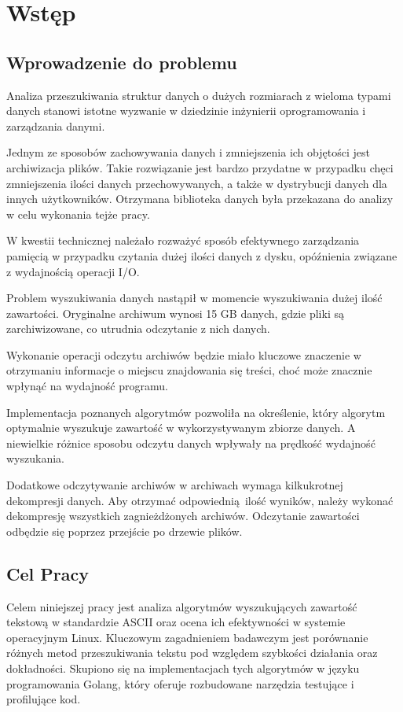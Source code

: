 \chapter{Wstęp}

\section{Wprowadzenie do problemu}
Analiza przeszukiwania struktur danych o dużych rozmiarach z wieloma typami danych stanowi
istotne wyzwanie w dziedzinie inżynierii oprogramowania i zarządzania danymi. 

Jednym ze sposobów zachowywania danych i zmniejszenia ich objętości jest 
archiwizacja plików. Takie rozwiązanie jest bardzo przydatne w przypadku chęci
zmniejszenia ilości danych przechowywanych, a także w dystrybucji danych dla
innych użytkowników. Otrzymana biblioteka danych była przekazana do analizy w 
celu wykonania tejże pracy.

W kwestii technicznej należało rozważyć sposób efektywnego zarządzania pamięcią
w przypadku czytania dużej ilości danych z dysku, opóźnienia związane z 
wydajnością operacji I/O.

Problem wyszukiwania danych nastąpił w momencie wyszukiwania dużej ilość 
zawartości. Oryginalne archiwum wynosi 15 GB danych, gdzie pliki są 
zarchiwizowane, co utrudnia odczytanie z nich danych. 

Wykonanie operacji odczytu archiwów będzie miało kluczowe znaczenie w 
otrzymaniu informacje o miejscu znajdowania się treści, choć może znacznie 
wpłynąć na wydajność programu.

Implementacja poznanych algorytmów pozwoliła na określenie, który algorytm 
optymalnie wyszukuje zawartość w wykorzystywanym zbiorze danych. A niewielkie
różnice sposobu odczytu danych wpływały na prędkość wydajność wyszukania.

Dodatkowe odczytywanie archiwów w archiwach wymaga kilkukrotnej dekompresji
danych. Aby otrzymać odpowiednią ilość wyników, należy wykonać dekompresję 
wszystkich zagnieżdżonych archiwów. Odczytanie zawartości odbędzie się poprzez 
przejście po drzewie plików.

\section{Cel Pracy}

Celem niniejszej pracy jest analiza algorytmów wyszukujących zawartość tekstową 
w standardzie ASCII oraz ocena ich efektywności w systemie operacyjnym Linux. 
Kluczowym zagadnieniem badawczym jest porównanie różnych metod przeszukiwania 
tekstu pod względem szybkości działania oraz dokładności. Skupiono się na 
implementacjach tych algorytmów w języku programowania Golang, który oferuje
rozbudowane narzędzia testujące i profilujące kod.


